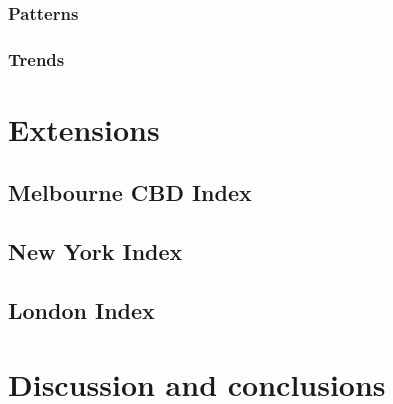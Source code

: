 \documentclass[preprint, 3p,
authoryear]{elsarticle} %
\begin{document}
\hypertarget{patterns}{%
\subsubsection{Patterns}\label{patterns}}

\hypertarget{trends}{%
\subsubsection{Trends}\label{trends}}

\hypertarget{extensions}{%
\section{Extensions}\label{extensions}}

\hypertarget{melbourne-cbd-index}{%
\subsection{Melbourne CBD Index}\label{melbourne-cbd-index}}

\hypertarget{new-york-index}{%
\subsection{New York Index}\label{new-york-index}}

\hypertarget{london-index}{%
\subsection{London Index}\label{london-index}}

\hypertarget{discussion-and-conclusions}{%
\section{Discussion and conclusions}\label{discussion-and-conclusions}}

\renewcommand\refname{References}

\end{document}
